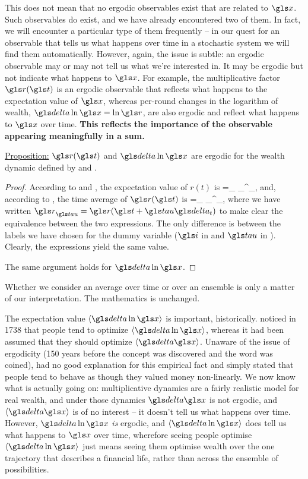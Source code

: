 This does not mean that no ergodic observables exist that are related to $\x$. Such observables do exist, and we have already encountered two of them. In fact, we will encounter a particular type
of them frequently -- in our quest for an observable that tells us what happens over time in a stochastic system we will find them automatically. However, again, the issue is subtle: an ergodic observable may or may not tell  us what we're interested in. It may be ergodic but not indicate what happens to $\x$. For example, the multiplicative factor $\gr(\t)$ is an ergodic observable that reflects what happens to the expectation value of $\x$, whereas per-round changes in the logarithm of wealth, $\d \ln \x = \ln \gr$, are also ergodic and reflect what happens to $\x$ over time. \textbf{This reflects the importance of the observable appearing meaningfully in a sum.}

\vspace{.3cm}
\underline{Proposition:} $\gr(\t)$ and $\d \ln \x$  are ergodic for the wealth dynamic defined by  and .

\begin{proof}
According to  and , the expectation value of $r(t)$ is
\be
\ave{\gr}=\lim_{\N\to\infty}  \sum_\gi^\N \gr_\gi,
\ee
and, according to , the time average of $\gr(\t)$ is
\be
\tave{\gr}=\lim_{\T\to\infty}  \sum_\gtau^\T \gr_\gtau,
\ee
where we have written $\gr_\gtau = \gr(\t+\gtau\dt)$ to make clear the equivalence between the two expressions. The only difference is between the labels we have chosen for the dummy variable ($\gi$ in  and $\gtau$ in ). Clearly, the expressions yield the same value. 

The same argument holds for $\d \ln \x$.
\end{proof}

Whether we consider  an average over time or over an ensemble is only a matter of our interpretation. The mathematics is unchanged.

The expectation value $\ave{\d \ln \x}$ is important, historically.  noticed in 1738 \cite{Bernoulli1738} that people tend to optimize $\ave{\d \ln \x}$, whereas it had been assumed that they should optimize $\ave{\d \x}$. Unaware of the issue of ergodicity (150 years before the concept was discovered and the word was coined),  had no good explanation for this empirical fact and simply stated that people tend to behave as though they valued money non-linearly. We now know what is actually going on: multiplicative dynamics are a fairly realistic model for real wealth, and under those dynamics $\d \x$ is not ergodic, and $\ave{\d \x}$ is of no interest -- it doesn't tell us what happens over time. However, $\d \ln \x$ {\it is} ergodic, and $\ave{\d \ln \x}$ does tell us what happens to $\x$ over time, wherefore seeing people optimise $\ave{\d \ln \x}$ just means seeing them optimise wealth over the one trajectory that describes a financial life, rather than across the ensemble of possibilities.

